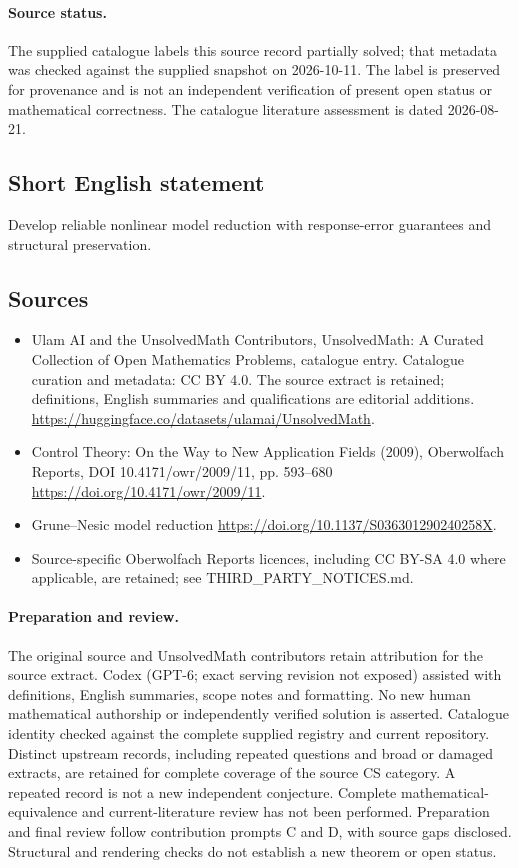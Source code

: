 \documentclass[11pt]{article}
\begin{document}
\paragraph{Source status.}
The supplied catalogue labels this source record partially solved; that metadata was checked against the supplied snapshot on 2026-10-11. The label is preserved for provenance and is not an independent verification of present open status or mathematical correctness. The catalogue literature assessment is dated 2026-08-21.
\subsection{Short English statement}
Develop reliable nonlinear model reduction with response-error guarantees and structural preservation.
\subsection{Sources}
\begin{itemize}
\item[\hypertarget{source:statement:1}{S1}] Ulam AI and the UnsolvedMath Contributors, UnsolvedMath: A Curated Collection of Open Mathematics Problems, catalogue entry. Catalogue curation and metadata: CC BY 4.0. The source extract is retained; definitions, English summaries and qualifications are editorial additions.
\url{https://huggingface.co/datasets/ulamai/UnsolvedMath}.
\item[\hypertarget{source:statement:2}{S2}] Control Theory: On the Way to New Application Fields (2009), Oberwolfach Reports, DOI 10.4171/owr/2009/11, pp. 593--680
\url{https://doi.org/10.4171/owr/2009/11}.
\item[\hypertarget{source:statement:3}{S3}] Grune--Nesic model reduction
\url{https://doi.org/10.1137/S036301290240258X}.
\item Source-specific Oberwolfach Reports licences, including CC BY-SA 4.0 where applicable, are retained; see THIRD\_PARTY\_NOTICES.md.
\end{itemize}
\paragraph{Preparation and review.}
The original source and UnsolvedMath contributors retain attribution for the source extract. Codex (GPT-6; exact serving revision not exposed) assisted with definitions, English summaries, scope notes and formatting. No new human mathematical authorship or independently verified solution is asserted. Catalogue identity checked against the complete supplied registry and current repository. Distinct upstream records, including repeated questions and broad or damaged extracts, are retained for complete coverage of the source CS category. A repeated record is not a new independent conjecture. Complete mathematical-equivalence and current-literature review has not been performed. Preparation and final review follow contribution prompts C and D, with source gaps disclosed. Structural and rendering checks do not establish a new theorem or open status.
\label{end:statement}
\end{document}
